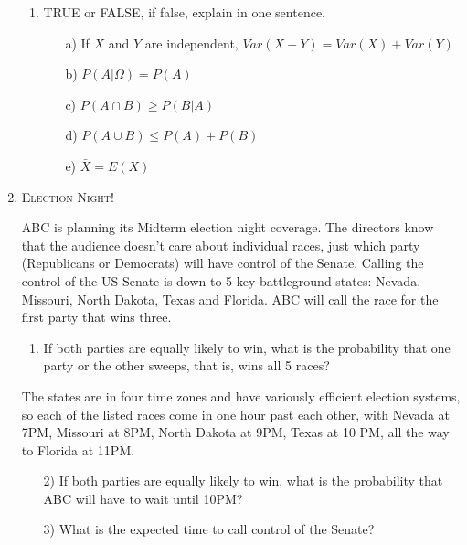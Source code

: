 \documentclass[11pt,letterpaper]{article}
\numberwithin{equation}{section}
\begin{document}
\begin{enumerate}[I]
\begin{enumerate}[1)]
\item TRUE or FALSE, if false, explain in one sentence.
\begin{enumerate}
\item[a)] If $X$ and $Y$ are independent, $Var(X+Y)=Var(X)+Var(Y)$
\item[b)] $P(A|\Omega)=P(A)$
\item[c)] $P(A\cap B)\geq P(B|A)$
\item[d)] $P(A\cup B)\leq P(A)+P(B)$
\item[e)] $\bar{X}=E(X)$
\end{enumerate}

\end{enumerate}
\pagebreak
\item \textsc{Election Night!} 

ABC is planning its Midterm election night coverage.  The directors know that the audience doesn't care about individual races, just which party (Republicans or Democrats) will have control of the Senate.  Calling the control of the US Senate is down to 5 key battleground states:  Nevada, Missouri, North Dakota, Texas and Florida.  ABC will call the race for the first party that wins three.   
\begin{enumerate}[1)]
\item  If both parties are equally likely to win, what is the probability that one party or the other sweeps, that is, wins all 5 races?
\end{enumerate}

The states are in four time zones and have variously efficient election systems, so each of the listed races come in one hour past each other, with Nevada at 7PM, Missouri at 8PM, North Dakota at 9PM, Texas at 10 PM, all the way to Florida at 11PM.
\begin{enumerate}
\item[2)] If both parties are equally likely to win, what is the probability that ABC will have to wait until 10PM?
\item[3)] What is the expected time to call control of the Senate?
\end{enumerate}



\end{enumerate}
\end{document}
